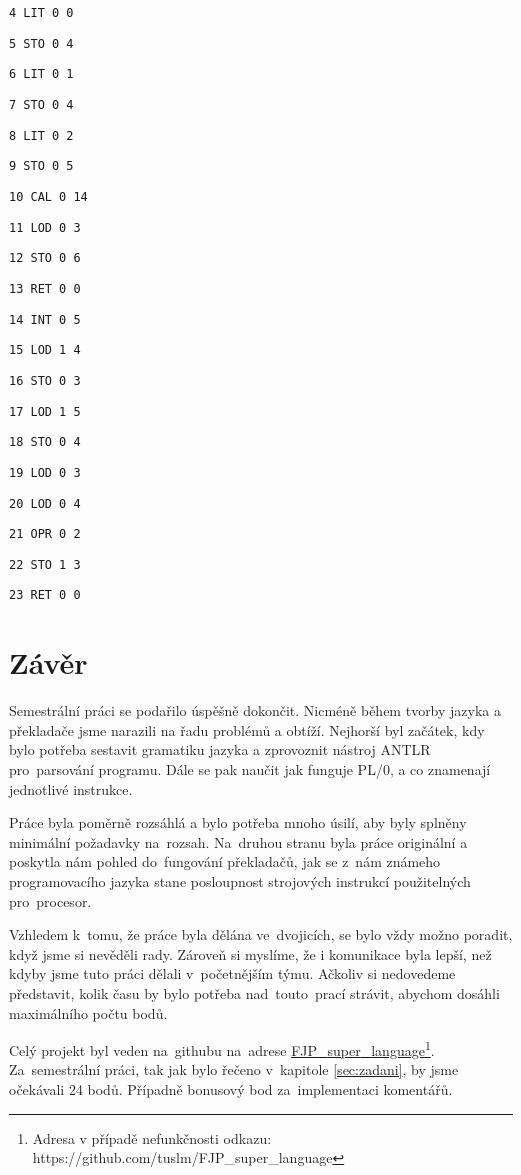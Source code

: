 \documentclass[czech]{thesiskiv}
\begin{document}
\texttt{4	LIT	0	0           }

\texttt{5	STO	0	4          }

\texttt{6	LIT	0	1         }

\texttt{7	STO	0	4        }

\texttt{8	LIT	0	2       }

\texttt{9	STO	0	5      }

\texttt{10	CAL	0	14  }

\texttt{11	LOD	0	3  }

\texttt{12	STO	0	6 }

\texttt{13	RET	0	0         }

\texttt{14	INT	0	5        }

\texttt{15	LOD	1	4       }

\texttt{16	STO	0	3      }

\texttt{17	LOD	1	5     }

\texttt{18	STO	0	4    }

\texttt{19	LOD	0	3   }

\texttt{20	LOD	0	4  }

\texttt{21	OPR	0	2 }

\texttt{22	STO	1	3}

\texttt{23	RET	0	0}



\chapter{Závěr}
Semestrální práci se podařilo úspěšně dokončit. Nicméně během tvorby jazyka a překladače
jsme narazili na řadu problémů a obtíží. Nejhorší byl začátek, kdy bylo potřeba sestavit gramatiku jazyka
a zprovoznit nástroj ANTLR pro~parsování programu. Dále se pak naučit jak funguje PL/0, a co znamenají jednotlivé instrukce.

Práce byla poměrně rozsáhlá a bylo potřeba mnoho úsilí, aby byly splněny minimální požadavky na~rozsah.
Na~druhou stranu byla práce originální a poskytla nám pohled do~fungování překladačů,
jak se z~nám známeho programovacího jazyka stane posloupnost strojových instrukcí použitelných pro~procesor.

Vzhledem k~tomu, že práce byla dělána ve~dvojicích, se bylo vždy možno poradit, když jsme si nevěděli rady.
Zároveň si myslíme, že i komunikace byla lepší, než kdyby jsme tuto práci dělali v~početnějším týmu.
Ačkoliv si nedovedeme představit, kolik času by bylo potřeba nad~touto~prací strávit, abychom dosáhli maximálního počtu bodů.

Celý projekt byl veden na~githubu na~adrese \href{https://github.com/tuslm/FJP\_{super}\_{language}}{FJP\_{super}\_{language}}\footnote{Adresa v případě nefunkčnosti odkazu: https://github.com/tuslm/FJP\_{super}\_{language}}.
Za~semestrální práci, tak jak bylo řečeno v~kapitole \ref{sec:zadani}, by jsme očekávali 24 bodů. Případně
bonusový bod za~implementaci komentářů.
\end{document}
